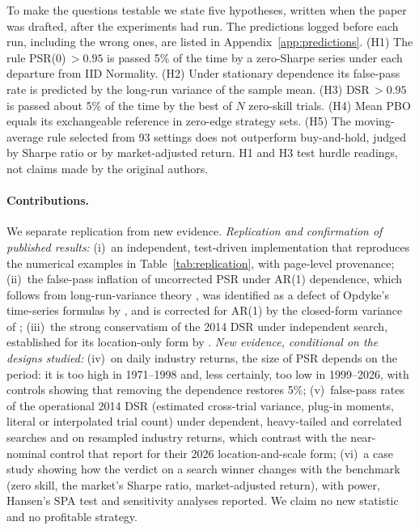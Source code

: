 \documentclass[11pt,a4paper]{article}
\begin{document}
\noindent To make the questions testable we state five hypotheses, written when the paper was drafted, after the experiments had run. The predictions logged before each run, including the wrong ones, are listed in Appendix~\ref{app:predictions}. (H1) The rule PSR(0)$\,>0.95$ is passed 5\% of the time by a zero-Sharpe series under each departure from IID Normality. (H2) Under stationary dependence its false-pass rate is predicted by the long-run variance of the sample mean. (H3) DSR$\,>0.95$ is passed about 5\% of the time by the best of $N$ zero-skill trials. (H4) Mean PBO equals its exchangeable reference in zero-edge strategy sets. (H5) The moving-average rule selected from 93 settings does not outperform buy-and-hold, judged by Sharpe ratio or by market-adjusted return. H1 and H3 test hurdle readings, not claims made by the original authors.

\paragraph{Contributions.} We separate replication from new evidence.
\emph{Replication and confirmation of published results:} (i)~an independent, test-driven implementation that reproduces the numerical examples in Table~\ref{tab:replication}, with page-level provenance; (ii)~the false-pass inflation of uncorrected PSR under AR(1) dependence, which follows from long-run-variance theory \citep{lo2002}, was identified as a defect of Opdyke's time-series formulas by \citet[Remark~3.1]{ledoit2008}, and is corrected for AR(1) by the closed-form variance of \citet[Eq.~2]{lopezdeprado2026lipton}; (iii)~the strong conservatism of the 2014 DSR under independent search, established for its location-only form by \citet[Exhibit~3]{lopezdeprado2026porcu}.
\emph{New evidence, conditional on the designs studied:} (iv)~on daily industry returns, the size of PSR depends on the period: it is too high in 1971--1998 and, less certainly, too low in 1999--2026, with controls showing that removing the dependence restores 5\%; (v)~false-pass rates of the operational 2014 DSR (estimated cross-trial variance, plug-in moments, literal or interpolated trial count) under dependent, heavy-tailed and correlated searches and on resampled industry returns, which contrast with the near-nominal control that \citet[p.~23]{lopezdeprado2026lipton} report for their 2026 location-and-scale form; (vi)~a case study showing how the verdict on a search winner changes with the benchmark (zero skill, the market's Sharpe ratio, market-adjusted return), with power, Hansen's SPA test and sensitivity analyses reported. We claim no new statistic and no profitable strategy.
\end{document}
